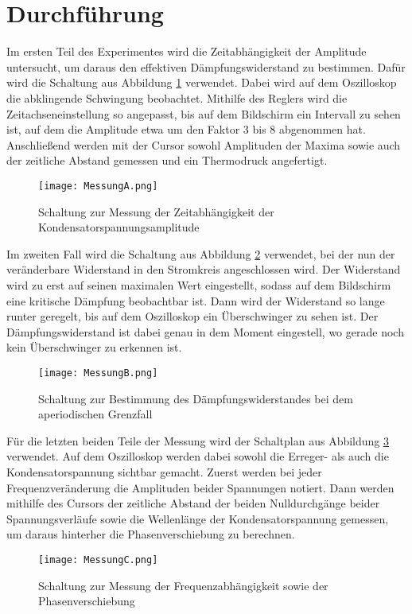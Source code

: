 \newpage

\section{Durchführung}

Im ersten Teil des Experimentes wird die Zeitabhängigkeit der Amplitude untersucht,
um daraus den effektiven Dämpfungswiderstand zu bestimmen. Dafür wird die Schaltung
aus Abbildung \ref{fig:MessungA} verwendet. Dabei wird auf dem Oszilloskop die abklingende Schwingung
beobachtet. Mithilfe des Reglers wird die Zeitachseneinstellung so angepasst, bis
auf dem Bildschirm ein Intervall zu sehen ist, auf dem die Amplitude etwa um
den Faktor 3 bis 8 abgenommen hat. Anschließend werden mit der Cursor sowohl
Amplituden der Maxima sowie auch der zeitliche Abstand gemessen und ein Thermodruck
angefertigt.

\FloatBarrier
\begin{figure}
  \centering
  \texttt{[image: MessungA.png]}
  \caption{Schaltung zur Messung der Zeitabhängigkeit der Kondensatorspannungsamplitude}
  \label{fig:MessungA}
\end{figure}
\FloatBarrier

Im zweiten Fall wird die Schaltung aus Abbildung \ref{fig:MessungB} verwendet, bei der nun der
veränderbare Widerstand in den Stromkreis angeschlossen wird. Der Widerstand wird
zu erst auf seinen maximalen Wert eingestellt, sodass auf dem Bildschirm eine
kritische Dämpfung beobachtbar ist. Dann wird der Widerstand so lange runter geregelt, bis
auf dem Oszilloskop ein Überschwinger zu sehen ist. Der Dämpfungswiderstand ist
dabei genau in dem Moment eingestell, wo gerade noch kein Überschwinger zu erkennen
ist.

\FloatBarrier
\begin{figure}
  \centering
  \texttt{[image: MessungB.png]}
  \caption{Schaltung zur Bestimmung des Dämpfungswiderstandes bei dem aperiodischen Grenzfall}
  \label{fig:MessungB}
\end{figure}
\FloatBarrier

Für die letzten beiden Teile der Messung wird der Schaltplan aus Abbildung \ref{fig:MessungC} verwendet.
Auf dem Oszilloskop werden dabei sowohl die Erreger- als auch die Kondensatorspannung
sichtbar gemacht. Zuerst werden bei jeder Frequenzveränderung die Amplituden beider
Spannungen notiert. Dann werden mithilfe des Cursors der zeitliche Abstand der beiden
Nulldurchgänge beider Spannungsverläufe sowie die Wellenlänge der Kondensatorspannung
gemessen, um daraus hinterher die Phasenverschiebung zu berechnen.

\FloatBarrier
\begin{figure}
  \centering
  \texttt{[image: MessungC.png]}
  \caption{Schaltung zur Messung der Frequenzabhängigkeit sowie der Phasenverschiebung}
  \label{fig:MessungC}
\end{figure}
\FloatBarrier





